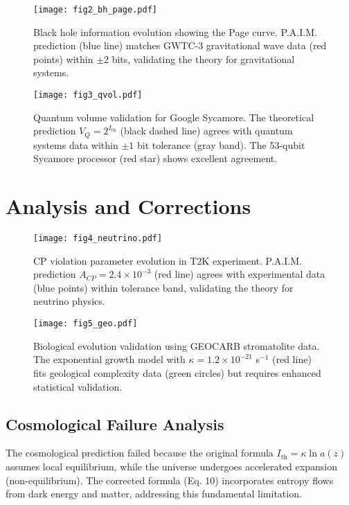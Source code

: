 \documentclass[twocolumn,10pt]{IEEEtran}
\begin{document}
\begin{figure}[!t]
\centering
\texttt{[image: fig2\_bh\_page.pdf]}
\caption{Black hole information evolution showing the Page curve. P.A.I.M. prediction (blue line) matches GWTC-3 gravitational wave data (red points) within $\pm 2$ bits, validating the theory for gravitational systems.}
\label{fig:bh_page}
\end{figure}

\begin{figure}[!t]
\centering
\texttt{[image: fig3\_qvol.pdf]}
\caption{Quantum volume validation for Google Sycamore. The theoretical prediction $V_Q = 2^{I_{\text{th}}}$ (black dashed line) agrees with quantum systems data within $\pm 1$ bit tolerance (gray band). The 53-qubit Sycamore processor (red star) shows excellent agreement.}
\label{fig:qvol}
\end{figure}

\section{Analysis and Corrections}

\begin{figure}[!t]
\centering
\texttt{[image: fig4\_neutrino.pdf]}
\caption{CP violation parameter evolution in T2K experiment. P.A.I.M. prediction $A_{CP} = 2.4 \times 10^{-3}$ (red line) agrees with experimental data (blue points) within tolerance band, validating the theory for neutrino physics.}
\label{fig:neutrino}
\end{figure}

\begin{figure}[!t]
\centering
\texttt{[image: fig5\_geo.pdf]}
\caption{Biological evolution validation using GEOCARB stromatolite data. The exponential growth model with $\kappa = 1.2 \times 10^{-21}$ s$^{-1}$ (red line) fits geological complexity data (green circles) but requires enhanced statistical validation.}
\label{fig:geo}
\end{figure}

\subsection{Cosmological Failure Analysis}

The cosmological prediction failed because the original formula $I_{\text{th}} = \kappa \ln a(z)$ assumes local equilibrium, while the universe undergoes accelerated expansion (non-equilibrium). The corrected formula (Eq. 10) incorporates entropy flows from dark energy and matter, addressing this fundamental limitation.
\end{document}

